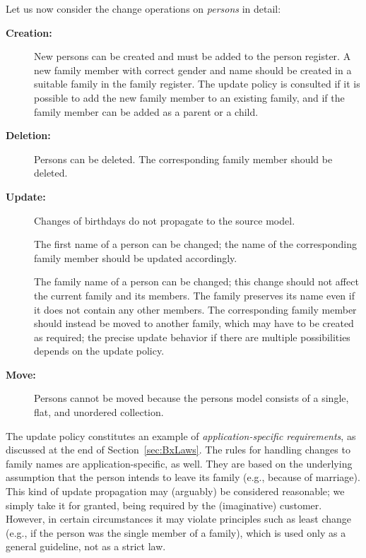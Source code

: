 
Let us now consider the change operations on \emph{persons} in detail:

\begin{description}
    \item[\textbf{Creation:}]
    New persons can be created and must be added to the person register.
    A new family member with correct gender and name should be created in a suitable family in the family register.
    The update policy is consulted if it is possible to add the new family member to an existing family, and if the family member can be added as a parent or a child.
    
    \item[\textbf{Deletion:}]
    Persons can be deleted.
    The corresponding family member should be deleted. 

    \item[\textbf{Update:}]
    Changes of birthdays do not propagate to the source model. 

    The first name of a person can be changed; 
    the name of the corresponding family member should be updated accordingly. 

    The family name of a person can be changed; 
    this change should not affect the current family and its members.
    The family preserves its name even if it does not contain any other members.
    The corresponding family member should instead be moved to another family, which may have to be created as required; the precise update behavior if there are multiple possibilities depends on the update policy.
    
    \item[\textbf{Move:}]
    Persons cannot be moved because the persons model consists of a single, flat, and unordered collection. 
\end{description}

The update policy constitutes an example of \emph{ap\-pli\-ca\-tion-specific requirements}, as discussed at the end of Section~\ref{sec:BxLaws}. The rules for handling changes to family names are application-specific, as well. They are based on the underlying assumption that the person intends to leave its family (e.g., because of marriage). This kind of update propagation may (arguably) be considered reasonable; we simply take it for granted, being required by the (imaginative) customer. However, in certain circumstances it may violate principles such as least change (e.g., if the person was the single member of a family), which is used only as a general guideline, not as a strict law. 


